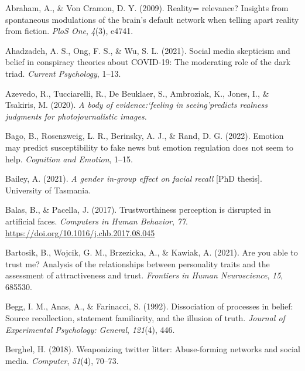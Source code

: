 \documentclass[
  man,floatsintext]{apa6}
\newlength{\cslhangindent}
\newlength{\cslentryspacingunit} %
\newenvironment{CSLReferences}[2] %
 {%
  \setlength{\parindent}{0pt}
  \ifodd #1
  \let\oldpar\par
  \def\par{\hangindent=\cslhangindent\oldpar}
  \fi
  \setlength{\parskip}{#2\cslentryspacingunit}
 }%
 {}
\begin{document}
\hypertarget{refs}{}
\begin{CSLReferences}{1}{0}
\leavevmode{}%
Abraham, A., \& Von Cramon, D. Y. (2009). Reality= relevance? Insights from spontaneous modulations of the brain's default network when telling apart reality from fiction. \emph{PloS One}, \emph{4}(3), e4741.

\leavevmode{}%
Ahadzadeh, A. S., Ong, F. S., \& Wu, S. L. (2021). Social media skepticism and belief in conspiracy theories about COVID-19: The moderating role of the dark triad. \emph{Current Psychology}, 1--13.

\leavevmode{}%
Azevedo, R., Tucciarelli, R., De Beuklaer, S., Ambroziak, K., Jones, I., \& Tsakiris, M. (2020). \emph{A body of evidence:`feeling in seeing'predicts realness judgments for photojournalistic images.}

\leavevmode{}%
Bago, B., Rosenzweig, L. R., Berinsky, A. J., \& Rand, D. G. (2022). Emotion may predict susceptibility to fake news but emotion regulation does not seem to help. \emph{Cognition and Emotion}, 1--15.

\leavevmode{}%
Bailey, A. (2021). \emph{A gender in-group effect on facial recall} {[}PhD thesis{]}. University of Tasmania.

\leavevmode{}%
Balas, B., \& Pacella, J. (2017). Trustworthiness perception is disrupted in artificial faces. \emph{Computers in Human Behavior}, \emph{77}. \url{https://doi.org/10.1016/j.chb.2017.08.045}

\leavevmode{}%
Bartosik, B., Wojcik, G. M., Brzezicka, A., \& Kawiak, A. (2021). Are you able to trust me? Analysis of the relationships between personality traits and the assessment of attractiveness and trust. \emph{Frontiers in Human Neuroscience}, \emph{15}, 685530.

\leavevmode{}%
Begg, I. M., Anas, A., \& Farinacci, S. (1992). Dissociation of processes in belief: Source recollection, statement familiarity, and the illusion of truth. \emph{Journal of Experimental Psychology: General}, \emph{121}(4), 446.

\leavevmode{}%
Berghel, H. (2018). Weaponizing twitter litter: Abuse-forming networks and social media. \emph{Computer}, \emph{51}(4), 70--73.


\end{CSLReferences}
\end{document}
